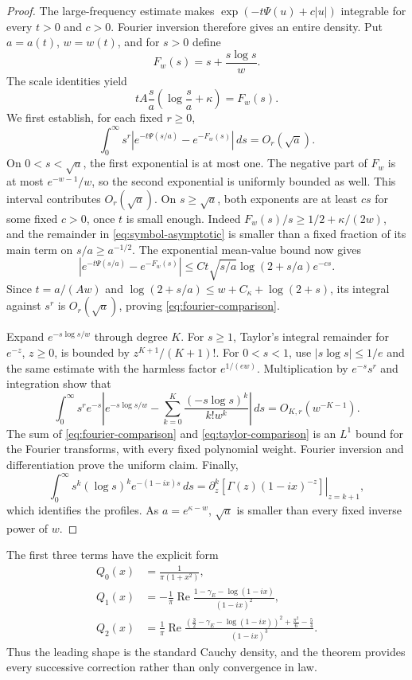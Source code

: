 \begin{proof}
The large-frequency estimate makes
$\exp(-t\Psi(u)+c|u|)$ integrable for every $t>0$ and $c>0$.
Fourier inversion therefore gives an entire density.
Put $a=a(t)$, $w=w(t)$, and for $s>0$ define
\[
 F_w(s)=s+\frac{s\log s}{w}.
\]
The scale identities yield
\[
 tA\frac{s}{a}\left(\log\frac{s}{a}+\kappa\right)=F_w(s).
\]
We first establish, for each fixed $r\geq0$,
\begin{equation}\label{eq:fourier-comparison}
 \int_0^\infty s^r
  \left|e^{-t\Psi(s/a)}-e^{-F_w(s)}\right|\,ds
 =O_r(\sqrt a).
\end{equation}
On $0<s<\sqrt a$, the first exponential is at most one. The negative
part of $F_w$ is at most $e^{-w-1}/w$, so the second exponential is
uniformly bounded as well. This interval contributes $O_r(\sqrt a)$.
On $s\geq\sqrt a$, both exponents are at least $cs$ for some fixed
$c>0$, once $t$ is small enough. Indeed
$F_w(s)/s\geq 1/2+\kappa/(2w)$, and the remainder in
\eqref{eq:symbol-asymptotic} is smaller than a fixed fraction of its
main term on $s/a\geq a^{-1/2}$. The exponential mean-value bound now gives
\[
 \left|e^{-t\Psi(s/a)}-e^{-F_w(s)}\right|
 \leq C t\sqrt{s/a}\log(2+s/a)e^{-cs}.
\]
Since $t=a/(Aw)$ and
$\log(2+s/a)\leq w+C_\kappa+\log(2+s)$, its integral against $s^r$
is $O_r(\sqrt a)$, proving \eqref{eq:fourier-comparison}.

Expand $e^{-s\log s/w}$ through degree $K$. For $s\geq1$, Taylor's
integral remainder for $e^{-z}$, $z\geq0$, is bounded by
$z^{K+1}/(K+1)!$. For $0<s<1$, use $|s\log s|\leq1/e$ and the
same estimate with the harmless factor $e^{1/(ew)}$. Multiplication by
$e^{-s}s^r$ and integration show that
\begin{equation}\label{eq:taylor-comparison}
 \int_0^\infty s^r e^{-s}
 \left|e^{-s\log s/w}
  -\sum_{k=0}^K\frac{(-s\log s)^k}{k!w^k}\right|\,ds
 =O_{K,r}(w^{-K-1}).
\end{equation}
The sum of \eqref{eq:fourier-comparison} and
\eqref{eq:taylor-comparison} is an $L^1$ bound for the Fourier
transforms, with every fixed polynomial weight. Fourier inversion and
differentiation prove the uniform claim. Finally,
\[
 \int_0^\infty s^k(\log s)^k e^{-(1-ix)s}\,ds
 =\left.\partial_z^k
       [\Gamma(z)(1-ix)^{-z}]\right|_{z=k+1},
\]
which identifies the profiles. As $a=e^{\kappa-w}$, $\sqrt a$ is
smaller than every fixed inverse power of $w$.
\end{proof}

The first three terms have the explicit form
\begin{align}
 Q_0(x)&=\frac1{\pi(1+x^2)},\label{eq:profile-zero}\\
 Q_1(x)&=-\frac1\pi\operatorname{Re}
       \frac{1-\gamma_{\!E}-\log(1-ix)}{(1-ix)^2},
       \label{eq:profile-one}\\
 Q_2(x)&=\frac1\pi\operatorname{Re}
       \frac{(\frac32-\gamma_{\!E}-\log(1-ix))^2+\frac{\pi^2}6-\frac54}
            {(1-ix)^3}.
       \label{eq:profile-two}
\end{align}
Thus the leading shape is the standard Cauchy density, and the theorem
provides every successive correction rather than only convergence in law.

